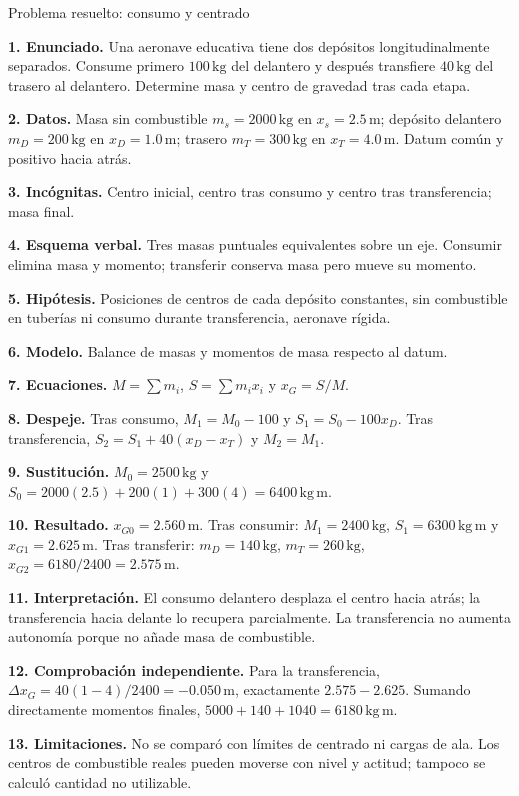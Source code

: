 \begin{studiumworked}{Problema resuelto: consumo y centrado}

\textbf{1. Enunciado.} Una aeronave educativa tiene dos depósitos longitudinalmente separados. Consume primero $100\,\mathrm{kg}$ del delantero y después transfiere $40\,\mathrm{kg}$ del trasero al delantero. Determine masa y centro de gravedad tras cada etapa.

\textbf{2. Datos.} Masa sin combustible $m_s=2000\,\mathrm{kg}$ en $x_s=2.5\,\mathrm{m}$; depósito delantero $m_D=200\,\mathrm{kg}$ en $x_D=1.0\,\mathrm{m}$; trasero $m_T=300\,\mathrm{kg}$ en $x_T=4.0\,\mathrm{m}$. Datum común y positivo hacia atrás.

\textbf{3. Incógnitas.} Centro inicial, centro tras consumo y centro tras transferencia; masa final.

\textbf{4. Esquema verbal.} Tres masas puntuales equivalentes sobre un eje. Consumir elimina masa y momento; transferir conserva masa pero mueve su momento.

\textbf{5. Hipótesis.} Posiciones de centros de cada depósito constantes, sin combustible en tuberías ni consumo durante transferencia, aeronave rígida.

\textbf{6. Modelo.} Balance de masas y momentos de masa respecto al datum.

\textbf{7. Ecuaciones.} $M=\sum m_i$, $S=\sum m_ix_i$ y $x_G=S/M$.

\textbf{8. Despeje.} Tras consumo, $M_1=M_0-100$ y $S_1=S_0-100x_D$. Tras transferencia, $S_2=S_1+40(x_D-x_T)$ y $M_2=M_1$.

\textbf{9. Sustitución.} $M_0=2500\,\mathrm{kg}$ y $S_0=2000(2.5)+200(1)+300(4)=6400\,\mathrm{kg\,m}$.

\textbf{10. Resultado.} $x_{G0}=2.560\,\mathrm{m}$. Tras consumir: $M_1=2400\,\mathrm{kg}$, $S_1=6300\,\mathrm{kg\,m}$ y $x_{G1}=2.625\,\mathrm{m}$. Tras transferir: $m_D=140\,\mathrm{kg}$, $m_T=260\,\mathrm{kg}$, $x_{G2}=6180/2400=2.575\,\mathrm{m}$.

\textbf{11. Interpretación.} El consumo delantero desplaza el centro hacia atrás; la transferencia hacia delante lo recupera parcialmente. La transferencia no aumenta autonomía porque no añade masa de combustible.

\textbf{12. Comprobación independiente.} Para la transferencia, $\Delta x_G=40(1-4)/2400=-0.050\,\mathrm{m}$, exactamente $2.575-2.625$. Sumando directamente momentos finales, $5000+140+1040=6180\,\mathrm{kg\,m}$.

\textbf{13. Limitaciones.} No se comparó con límites de centrado ni cargas de ala. Los centros de combustible reales pueden moverse con nivel y actitud; tampoco se calculó cantidad no utilizable.


\end{studiumworked}

